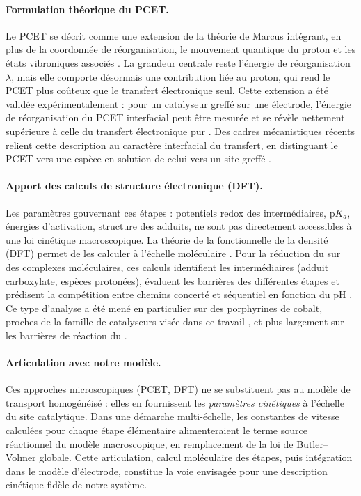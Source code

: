 \paragraph{Formulation théorique du PCET.}
Le PCET se décrit comme une extension de la théorie de Marcus intégrant, en
plus de la coordonnée de réorganisation, le mouvement quantique du proton et
les états vibroniques associés \cite{warburtonTheoreticalModelingElectrochemical2022}.
La grandeur centrale reste l'énergie de réorganisation $\lambda$, mais elle
comporte désormais une contribution liée au proton, qui rend le PCET plus
coûteux que le transfert électronique seul. Cette extension a été validée
expérimentalement : pour un catalyseur greffé sur une électrode, l'énergie de
réorganisation du PCET interfacial peut être mesurée et se révèle nettement
supérieure à celle du transfert électronique pur
\cite{kessingerReorganizationEnergiesInterfacial2022}. Des cadres
mécanistiques récents relient cette description au caractère interfacial du
transfert, en distinguant le PCET vers une espèce en solution de celui vers
un site greffé \cite{lewisMolecularLevelMechanisticFramework}.

\paragraph{Apport des calculs de structure électronique (DFT).}
Les paramètres gouvernant ces étapes : potentiels redox des intermédiaires,
$\mathrm{p}K_a$, énergies d'activation, structure des adduits, ne sont pas
directement accessibles à une loi cinétique macroscopique. La théorie de la
fonctionnelle de la densité (DFT) permet de les calculer à l'échelle
moléculaire \cite{al-mahayniExperimentalMethodsChemical2021}. Pour la
réduction du  sur des complexes moléculaires, ces calculs identifient
les intermédiaires (adduit carboxylate, espèces protonées), évaluent les
barrières des différentes étapes et prédisent la compétition entre chemins
concerté et séquentiel en fonction du pH
\cite{gottleProtoncoupledElectronTransfer2017}. Ce type d'analyse a été mené
en particulier sur des porphyrines de cobalt, proches de la famille de
catalyseurs visée dans ce travail \cite{gottleProtoncoupledElectronTransfer2017},
et plus largement sur les barrières de réaction du 
\cite{TheoreticalUnderstandingElectrochemical2017}.

\paragraph{Articulation avec notre modèle.}
Ces approches micro\-scopiques (PCET, DFT) ne se substituent pas au modèle de
transport homogénéisé : elles en fournissent les \emph{paramètres cinétiques}
à l'échelle du site catalytique. Dans une démarche multi-échelle, les
constantes de vitesse calculées pour chaque étape élémentaire alimenteraient
le terme source réactionnel du modèle macroscopique, en remplacement de la
loi de Butler--Volmer globale. Cette articulation, calcul moléculaire des
étapes, puis intégration dans le modèle d'électrode, constitue la voie
envisagée pour une description cinétique fidèle de notre système.

